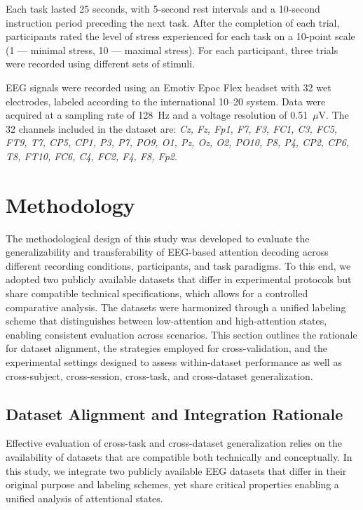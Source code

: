 \documentclass[utf8]{FrontiersinHarvard} %
\begin{document}
Each task lasted 25 seconds, with 5-second rest intervals and a 10-second instruction period preceding the next task. After the completion of each trial, participants rated the level of stress experienced for each task on a 10-point scale (1 — minimal stress, 10 — maximal stress). For each participant, three trials were recorded using different sets of stimuli. 

EEG signals were recorded using an Emotiv Epoc Flex headset with 32 wet electrodes, labeled according to the international 10--20 system. Data were acquired at a sampling rate of 128~Hz and a voltage resolution of 0.51~$\mu$V. The 32 channels included in the dataset are: \textit{Cz, Fz, Fp1, F7, F3, FC1, C3, FC5, FT9, T7, CP5, CP1, P3, P7, PO9, O1, Pz, Oz, O2, PO10, P8, P4, CP2, CP6, T8, FT10, FC6, C4, FC2, F4, F8, Fp2}.


\section{Methodology}

The methodological design of this study was developed to evaluate the generalizability and transferability of EEG-based attention decoding across different recording conditions, participants, and task paradigms. To this end, we adopted two publicly available datasets that differ in experimental protocols but share compatible technical specifications, which allows for a controlled comparative analysis. The datasets were harmonized through a unified labeling scheme that distinguishes between low-attention and high-attention states, enabling consistent evaluation across scenarios. This section outlines the rationale for dataset alignment, the strategies employed for cross-validation, and the experimental settings designed to assess within-dataset performance as well as cross-subject, cross-session, cross-task, and cross-dataset generalization.

\subsection{Dataset Alignment and Integration Rationale}

Effective evaluation of cross-task and cross-dataset generalization relies on the availability of datasets that are compatible both technically and conceptually. In this study, we integrate two publicly available EEG datasets that differ in their original purpose and labeling schemes, yet share critical properties enabling a unified analysis of attentional states.
\end{document}
